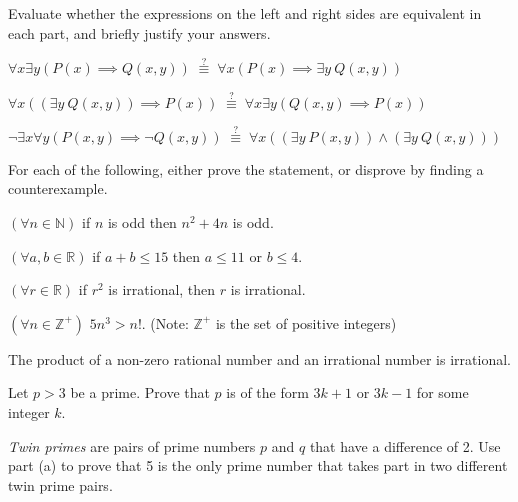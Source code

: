 \documentclass[11pt]{article}
\begin{document}

Evaluate whether the expressions on the left and right sides are equivalent in each part, and briefly justify your answers.

\begin{Parts}
    \Part $\forall x \exists y \left(P(x) \implies Q(x,y)\right) \;\overset{?}{\equiv}\; \forall x \left(P(x) \implies \exists y~Q(x,y)\right)$

    \Part $\forall x \left((\exists y~Q(x,y)) \implies P(x)\right) \;\overset{?}{\equiv}\; \forall x \exists y \left(Q(x,y) \implies P(x)\right)$

    \Part $\lnot \exists x \forall y \left(P(x,y) \implies \lnot Q(x,y)\right) \;\overset{?}{\equiv}\; \forall x \left( (\exists y~P(x,y)) \land (\exists y~Q(x,y)) \right)$
\end{Parts}


For each of the following, either prove the statement, or disprove by finding a counterexample.
\begin{Parts}
	\Part $(\forall n \in \mathbb{N})$ if $n$ is odd then $n^2 + 4n$ is odd.

	\Part $(\forall a, b \in \mathbb{R})$ if $a + b \le 15$ then $a \le 11$ or $b \le 4$.

	\Part $(\forall r \in \mathbb{R})$ if $r^2$ is irrational, then $r$ is irrational.

	\Part $(\forall n \in \mathbb{Z}^+)$ $5n^3 > n!$. (Note: $\mathbb{Z}^+$ is the set of positive integers)

    \Part The product of a non-zero rational number and an irrational number is irrational.
\end{Parts}


\begin{Parts}
	\item Let $p > 3$ be a prime. Prove that $p$ is of the form $3k + 1$ or $3k-1$ for some integer $k$.

	\item \textit{Twin primes} are pairs of prime numbers $p$ and $q$ that have a difference of 2. Use part (a) to prove that 5 is the only prime number that takes part in two different twin prime pairs.
\end{Parts}
\end{document}
